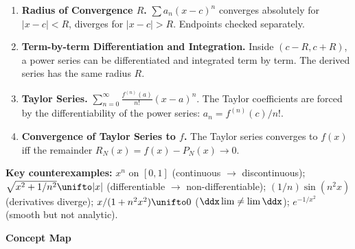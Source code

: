 \documentclass[worksheet]{workbook}
\begin{document}
\begin{enumerate}[label=\textbf{\Alph*.}, leftmargin=2.5em, itemsep=1pt]
\item \textbf{Radius of Convergence $R$.}  $\sum a_n(x-c)^n$ converges absolutely for $|x-c| < R$, diverges for $|x-c| > R$.  Endpoints checked separately.

\item \textbf{Term-by-term Differentiation and Integration.}  Inside $(c-R, c+R)$, a power series can be differentiated and integrated term by term.  The derived series has the same radius $R$.

\item \textbf{Taylor Series.}  $\sum_{n=0}^\infty \frac{f^{(n)}(a)}{n!}(x-a)^n$.  The Taylor coefficients are forced by the differentiability of the power series: $a_n = f^{(n)}(c)/n!$.

\item \textbf{Convergence of Taylor Series to $f$.}  The Taylor series converges to $f(x)$ iff the remainder $R_N(x) = f(x) - P_N(x) \to 0$.

\end{enumerate}

\normalsize

\medskip

\noindent\textbf{Key counterexamples:} $x^n$ on $[0,1]$ (continuous $\to$ discontinuous); $\sqrt{x^2+1/n^2}\unifto |x|$ (differentiable $\to$ non-differentiable); $(1/n)\sin(n^2 x)$ (derivatives diverge); $x/(1+n^2 x^2)\unifto 0$ ($ \ddx\lim \neq \lim \ddx$); $e^{-1/x^2}$ (smooth but not analytic).


\newpage
\begin{center}
{\large\bfseries\color{maroon} Concept Map}
\end{center}
\end{document}
